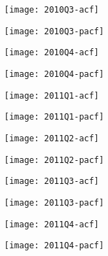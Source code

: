 \begin{figure}[htp]
	\centering
	\begin{subfigure}{0.23\textwidth}
		\centering
		\texttt{[image: 2010Q3-acf]}
	\end{subfigure}
	\begin{subfigure}{0.23\textwidth}
		\centering
		\texttt{[image: 2010Q3-pacf]}
	\end{subfigure}
	\begin{subfigure}{0.23\textwidth}
		\centering
		\texttt{[image: 2010Q4-acf]}
	\end{subfigure}
	\begin{subfigure}{0.23\textwidth}
		\centering
		\texttt{[image: 2010Q4-pacf]}
	\end{subfigure}
\end{figure}



\begin{figure}[htp]
	\centering
	\begin{subfigure}{0.23\textwidth}
		\centering
		\texttt{[image: 2011Q1-acf]}
	\end{subfigure}
	\begin{subfigure}{0.23\textwidth}
		\centering
		\texttt{[image: 2011Q1-pacf]}
	\end{subfigure}
	\begin{subfigure}{0.23\textwidth}
		\centering
		\texttt{[image: 2011Q2-acf]}
	\end{subfigure}
	\begin{subfigure}{0.23\textwidth}
		\centering
		\texttt{[image: 2011Q2-pacf]}
	\end{subfigure}
\end{figure}

\begin{figure}[htp]
	\centering
	\begin{subfigure}{0.23\textwidth}
		\centering
		\texttt{[image: 2011Q3-acf]}
	\end{subfigure}
	\begin{subfigure}{0.23\textwidth}
		\centering
		\texttt{[image: 2011Q3-pacf]}
	\end{subfigure}
	\begin{subfigure}{0.23\textwidth}
		\centering
		\texttt{[image: 2011Q4-acf]}
	\end{subfigure}
	\begin{subfigure}{0.23\textwidth}
		\centering
		\texttt{[image: 2011Q4-pacf]}
	\end{subfigure}
\end{figure}



